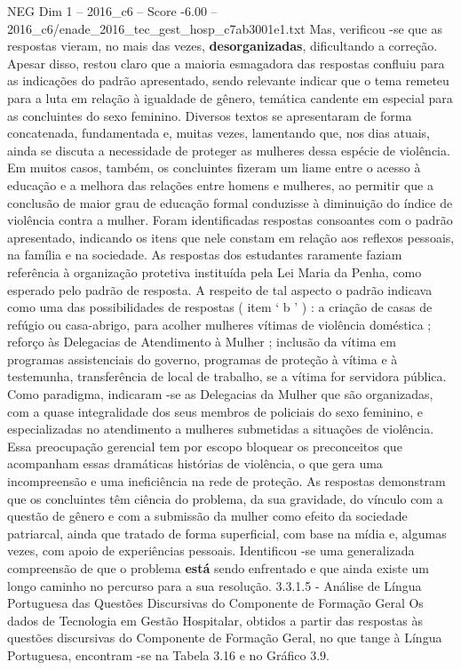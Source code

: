 \begin{textsample}{NEG Dim 1 – 2016\_c6 – Score -6.00 – 2016\_c6/enade\_2016\_tec\_gest\_hosp\_c7ab3001e1.txt}
Mas, verificou -se que as respostas vieram, no mais das vezes, \textbf{desorganizadas}, dificultando a correção.
Apesar disso, restou claro que a maioria esmagadora das respostas confluiu para as indicações do padrão apresentado, sendo relevante indicar que o tema remeteu para a luta em relação à igualdade de gênero, temática candente em especial para as concluintes do sexo feminino.
Diversos textos se apresentaram de forma concatenada, fundamentada e, muitas vezes, lamentando que, nos dias atuais, ainda se discuta a necessidade de proteger as mulheres dessa espécie de violência.
Em muitos casos, também, os concluintes fizeram um liame entre o acesso à educação e a melhora das relações entre homens e mulheres, ao permitir que a conclusão de maior grau de educação formal conduzisse à diminuição do índice de violência contra a mulher.
Foram identificadas respostas consoantes com o padrão apresentado, indicando os itens que nele constam em relação aos reflexos pessoais, na família e na sociedade.
As respostas dos estudantes raramente faziam referência à organização protetiva instituída pela Lei Maria da Penha, como esperado pelo padrão de resposta.
A respeito de tal aspecto o padrão indicava como uma das possibilidades de respostas ( item ‘ b ’ ) : a criação de casas de refúgio ou casa-abrigo, para acolher mulheres vítimas de violência doméstica ; reforço às Delegacias de Atendimento à Mulher ; inclusão da vítima em programas assistenciais do governo, programas de proteção à vítima e à testemunha, transferência de local de trabalho, se a vítima for servidora pública.
Como paradigma, indicaram -se as Delegacias da Mulher que são organizadas, com a quase integralidade dos seus membros de policiais do sexo feminino, e especializadas no atendimento a mulheres submetidas a situações de violência.
Essa preocupação gerencial tem por escopo bloquear os preconceitos que acompanham essas dramáticas histórias de violência, o que gera uma incompreensão e uma ineficiência na rede de proteção.
As respostas demonstram que os concluintes têm ciência do problema, da sua gravidade, do vínculo com a questão de gênero e com a submissão da mulher como efeito da sociedade patriarcal, ainda que tratado de forma superficial, com base na mídia e, algumas vezes, com apoio de experiências pessoais.
Identificou -se uma generalizada compreensão de que o problema \textbf{está} sendo enfrentado e que ainda existe um longo caminho no percurso para a sua resolução. 3.3.1.5 - Análise de Língua Portuguesa das Questões Discursivas do Componente de Formação Geral Os dados de Tecnologia em Gestão Hospitalar, obtidos a partir das respostas às questões discursivas do Componente de Formação Geral, no que tange à Língua Portuguesa, encontram -se na Tabela 3.16 e no Gráfico 3.9.

\end{textsample}
